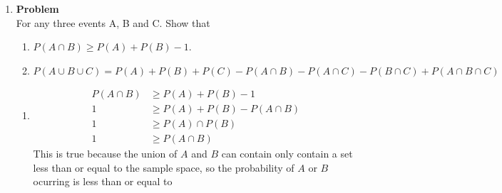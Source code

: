 \documentclass[12pt]{article}
\newenvironment{Ex}{\textbf{Problem}\vspace{.75em}\\}{}
\begin{document}
\begin{enumerate}
\begin{Ex}
\begin{solution}
\begin{enumerate}
        From this information we can obtain $A^c = \{1,2,4,5\}$ and
        $B^c=\{4,6\}$.

        And now we can insert the sets into the equation:
        \begin{equation*}
          \begin{aligned}
            A &= (A^c \cup B^c)^c \cup (A^c \cup B)^c \\
            &= (\{1,2,4,5\} \cup \{4,6\})^c \cup (\{1,2,4,5\}
            \cup \{1,2,3,5\})^c \\
            &= (\{1,2,4,5,6\})^c \cup (\{1,2,3,4,5\})^c \\
            &= \{3\} \cup \{6\} \\
            \{3, 6\} &= \{3, 6\}
          \end{aligned}
        \end{equation*}
        The probabilities for both sides have been determined to be
        equivalent ($\frac{1}{3}$).
      \end{enumerate}
    \end{solution}
  \end{Ex}
\item
  \begin{Ex} For any three events A, B and C. Show that
    \begin{enumerate}
    \item $P(A \cap B) \ge P(A)+P(B) - 1$.
    \item $P(A \cup B \cup C) = P(A) + P(B) + P(C) - P(A \cap B) - P(A
      \cap C) - P(B \cap C) + P(A \cap B \cap C)$
    \end{enumerate}
    \begin{solution} \hfill
      \begin{enumerate}
      \item 
        \begin{equation*}
          \begin{aligned}
            P(A \cap B) &\ge P(A) + P(B) - 1 \\
            1 &\ge P(A) + P(B) - P(A \cap B) \\
            1 &\ge P(A) \cap P(B) \\
            1 &\ge P(A \cap B)
          \end{aligned}
        \end{equation*}
        This is true because the union of $A$ and $B$ can contain only
        contain a set less than or equal to the sample space, so the
        probability of $A$ or $B$ ocurring is less than or equal to

\end{enumerate}
\end{solution}
\end{Ex}
\end{enumerate}
\end{document}
